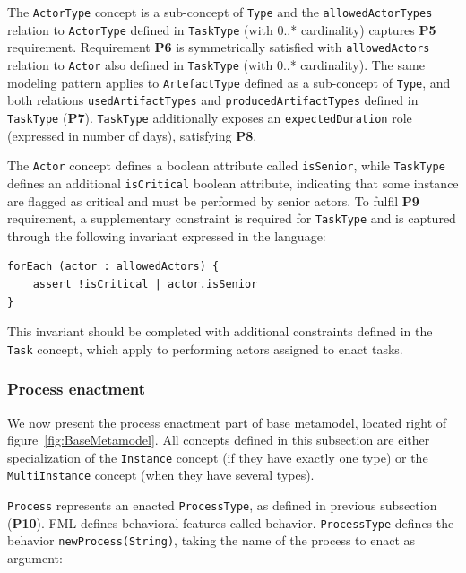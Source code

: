 The \texttt{ActorType} concept is a sub-concept of \texttt{Type} and the \texttt{allowedActorTypes} relation to \texttt{ActorType} defined in \texttt{TaskType} (with 0..* cardinality) captures \textbf{P5} requirement. Requirement \textbf{P6} is symmetrically satisfied with \texttt{allowedActors} relation to \texttt{Actor} also defined in \texttt{TaskType} (with 0..* cardinality). The same modeling pattern applies to \texttt{ArtefactType} defined as a sub-concept of \texttt{Type}, and both relations \texttt{usedArtifactTypes} and \texttt{producedArtifactTypes} defined in \texttt{TaskType} (\textbf{P7}). \texttt{TaskType} additionally exposes an \texttt{expectedDuration} role (expressed in number of days), satisfying \textbf{P8}.

The \texttt{Actor} concept defines a boolean attribute called \texttt{isSenior}, while \texttt{TaskType} defines an additional \texttt{isCritical} boolean attribute, indicating that some instance are flagged as critical and must be performed by senior actors. To fulfil \textbf{P9} requirement, a supplementary constraint is required for \texttt{TaskType} and is captured through the following invariant expressed in the \FML language:

\begin{lstlisting}
forEach (actor : allowedActors) {
    assert !isCritical | actor.isSenior
}
\end{lstlisting}

This invariant should be completed with additional constraints defined in the \texttt{Task} concept, which apply to performing actors assigned to enact tasks. 


\subsubsection{Process enactment}
\label{sec:ProcessEnactment}
We now present the process enactment part of base metamodel, located right of figure~\ref{fig:BaseMetamodel}. All concepts defined in this subsection are either specialization of the \texttt{Instance} concept (if they have exactly one type) or the \texttt{MultiInstance} concept (when they have several types).

\texttt{Process} represents an enacted \texttt{ProcessType}, as defined in previous subsection (\textbf{P10}). FML defines behavioral features called behavior. \texttt{ProcessType} defines the behavior \texttt{newProcess(String)}, taking the name of the process to enact as argument:


